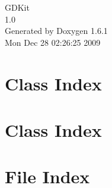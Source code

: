 \documentclass[a4paper]{book}
\begin{document}
\hypersetup{pageanchor=false}
\begin{titlepage}
\vspace*{7cm}
\begin{center}
{\Large GDKit \\[1ex]\large 1.0 }\\
\vspace*{1cm}
{\large Generated by Doxygen 1.6.1}\\
\vspace*{0.5cm}
{\small Mon Dec 28 02:26:25 2009}\\
\end{center}
\end{titlepage}
\clearemptydoublepage
{}
\tableofcontents
\clearemptydoublepage
{}
\hypersetup{pageanchor=true}
\chapter{Class Index}

\chapter{Class Index}

\chapter{File Index}

\end{document}

